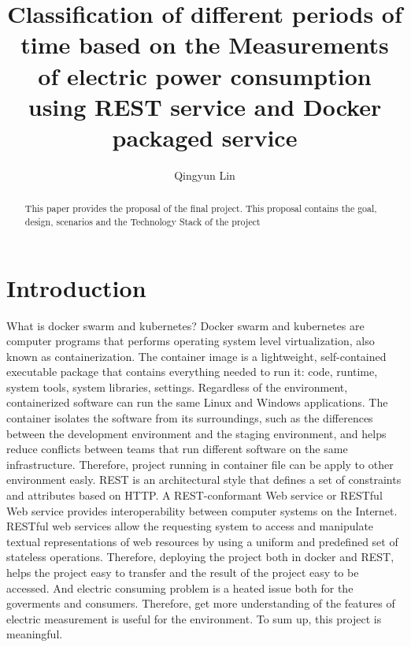 
\title{Classification of different periods of time based on the Measurements of electric power consumption using REST service and Docker packaged service}


\author{Qingyun Lin}


\renewcommand{\shortauthors}{G. v. Laszewski}


\begin{abstract}
This paper provides the proposal of the final project. This proposal contains the goal, design, scenarios and the Technology Stack of the project
\end{abstract}



\maketitle

\section{Introduction}

What is docker swarm and kubernetes? Docker swarm and kubernetes are computer programs that performs operating system level virtualization, also known as containerization. The container image is a lightweight, self-contained executable package that contains everything needed to run it: code, runtime, system tools, system libraries, settings. Regardless of the environment, containerized software can run the same Linux and Windows applications. The container isolates the software from its surroundings, such as the differences between the development environment and the staging environment, and helps reduce conflicts between teams that run different software on the same infrastructure. Therefore, project running in container file can be apply to other environment easly. REST is an architectural style that defines a set of constraints and attributes based on HTTP. A REST-conformant Web service or RESTful Web service provides interoperability between computer systems on the Internet. RESTful web services allow the requesting system to access and manipulate textual representations of web resources by using a uniform and predefined set of stateless operations. Therefore, deploying the project both in docker and REST, helps the project easy to transfer and the result of the project easy to be accessed. And electric consuming problem is a heated issue both for the goverments and consumers. Therefore, get more understanding of the features of electric measurement is useful for the environment. To sum up, this project is meaningful.


